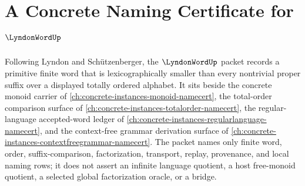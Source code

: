 \chapter{A Concrete Naming Certificate for $\LyndonWordUp$}
\label{ch:concrete-instances-lyndon-word-namecert}

Following Lyndon and Schützenberger, the $\LyndonWordUp$ packet records a primitive finite word that is lexicographically smaller than every nontrivial proper suffix over a displayed totally ordered alphabet. It sits beside the concrete monoid carrier of \autoref{ch:concrete-instances-monoid-namecert}, the total-order comparison surface of \autoref{ch:concrete-instances-totalorder-namecert}, the regular-language accepted-word ledger of \autoref{ch:concrete-instances-regularlanguage-namecert}, and the context-free grammar derivation surface of \autoref{ch:concrete-instances-contextfreegrammar-namecert}. The packet names only finite word, order, suffix-comparison, factorization, transport, replay, provenance, and local naming rows; it does not assert an infinite language quotient, a host free-monoid quotient, a selected global factorization oracle, or a bridge.

